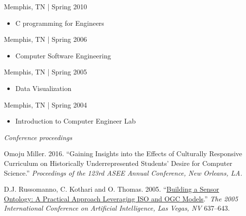 \documentclass[11pt,article,oneside]{memoir}
\begin{document}
 \hfill Memphis, TN | Spring 2010
\begin{itemize}[noitemsep,nolistsep]
\item[-] C programming for Engineers
\end{itemize}

 \hfill Memphis, TN | Spring 2006
\begin{itemize}[noitemsep,nolistsep]
\item[-] Computer Software Engineering
\end{itemize}

 \hfill Memphis, TN | Spring 2005
\begin{itemize}[noitemsep,nolistsep]
\item[-] Data Visualization
\end{itemize}

 \hfill Memphis, TN | Spring 2004
\begin{itemize}[noitemsep,nolistsep]
\item[-] Introduction to Computer Engineer Lab
\end{itemize}

\bigskip 


\medskip

\noindent\emph{Conference proceedings \vspace{0.05in}}


\ind Omoju Miller. 2016. ``Gaining Insights into the Effects of Culturally Responsive Curriculum on Historically Underrepresented Students' Desire for Computer Science.'' \emph{Proceedings of the 123rd ASEE Annual Conference, New Orleans, LA.}

\ind D.J. Russomanno, C. Kothari and O. Thomas. 2005. ``\href{https://scholar.google.com/citations?view_op=view_citation&hl=en&user=E7z_wrwAAAAJ&sortby=pubdate&citation_for_view=E7z_wrwAAAAJ:u5HHmVD_uO8C}{Building a Sensor Ontology: A Practical Approach Leveraging ISO and OGC Models}.'' \emph{The 2005 International Conference on Artificial Intelligence, Las Vegas, NV} 637--643.
\end{document}

